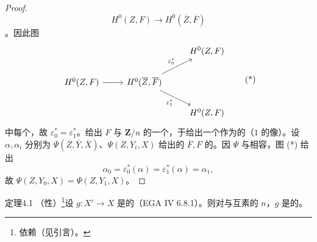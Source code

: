 \begin{proof}
\[H^0(Z,F)\longrightarrow H^0(\overline Z,\overline F)\]
。因此图
\[\begin{tikzcd}& &H^0(Z,F)\\H^0(Z,F)\arrow[r]&H^0(\overline Z,\overline F)\arrow[ur,"\varepsilon_0^*"]\arrow[dr,"\varepsilon_1^*"']\\&&H^0(Z,F)\end{tikzcd}\tag{*}\]
中每个，故 $\varepsilon_0^*=\varepsilon_1^*$。给出 $F$ 与 $\mathbf Z/n$ 的一个，于给出一个作为的（$1$ 的像）。设 $\alpha,\alpha_i$ 分别为 $\Psi(\overline Z,\overline Y,\overline X)$、$\Psi(Z,Y_i,X)$ 给出的 $\overline F,F$ 的。因 $\Psi$ 与相容，图 (*) 给出
\[\alpha_0=\varepsilon_0^*(\alpha)=\varepsilon_1^*(\alpha)=\alpha_1,\]
故 $\Psi(Z,Y_0,X)=\Psi(Z,Y_1,X)$。
\end{proof}
\begin{SGAresult}{定理}{4.1}
（性）\footnote{依赖（见引言）。}设 $g:X'\to X$ 是的（EGA IV 6.8.1）。则对与互素的 $n$，$g$ 是的。
\end{SGAresult}
